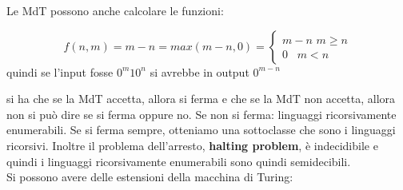 \documentclass[a4paper,12pt, oneside]{book}
\begin{document}
Le MdT possono anche calcolare le funzioni:
\begin{esempio}
$$f(n,m)=m-n=max(m-n,0)=\begin{cases}
m-n\,\,m\geq n\\
0\,\,\,\,\,m<n
\end{cases}$$
quindi se l'input fosse $0^m10^n$ si avrebbe in output $0^{m-n}$
\end{esempio}
si ha che se la MdT accetta, allora si ferma e che se la MdT non accetta, allora non si può dire se si ferma oppure no. Se non si ferma: linguaggi ricorsivamente enumerabili. Se si ferma sempre, otteniamo una sottoclasse che sono i linguaggi ricorsivi. Inoltre il problema dell'arresto, \textbf{halting problem}, è indecidibile e quindi i linguaggi ricorsivamente enumerabili sono quindi semidecibili.\\
Si possono avere delle estensioni della macchina di Turing:
\end{document}
